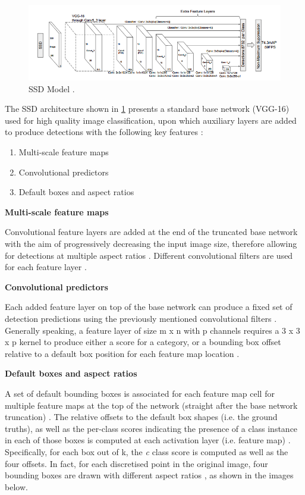 \begin{figure}[!htbp]
\begin{center}
\includegraphics[width=\linewidth]{images/ssd_architecture.png}
\end{center}
\caption{SSD Model \cite{paper:SSD}.}
\label{fig:sshModel}
\end{figure}

The SSD architecture shown in \ref{fig:sshModel} presents a standard base network (VGG-16) used for high quality image classification, upon which auxiliary layers are added to produce detections with the following key features \cite{paper:SSD}:

\begin{enumerate}
  \item Multi-scale feature maps
  \item Convolutional predictors
  \item Default boxes and aspect ratios
\end{enumerate}

\textbf{Multi-scale feature maps}

Convolutional feature layers are added at the end of the truncated base network with the aim of progressively decreasing the input image size, therefore allowing for detections at multiple aspect ratios \cite{paper:SSD}. Different convolutional filters are used for each feature layer \cite{paper:SSD}.

\textbf{Convolutional predictors}

Each added feature layer on top of the base network can produce a fixed set of detection predictions using the previously mentioned convolutional filters \cite{paper:SSD}. Generally speaking, a feature layer of size m x n with p channels requires a 3 x 3 x p kernel to produce either a score for a category, or a bounding box offset relative to a default box position for each feature map location \cite{paper:SSD}.

\textbf{Default boxes and aspect ratios}

A set of default bounding boxes is associated for each feature map cell for multiple feature maps at the top of the network (straight after the base network truncation) \cite{paper:SSD}. The relative offsets to the default box shapes (i.e. the ground truths), as well as the per-class scores indicating the presence of a class instance in each of those boxes is computed at each activation layer (i.e. feature map) \cite{paper:SSD}. Specifically, for each box out of k, the \textit{c} class score is computed as well as the four offsets. In fact, for each discretised point in the original image, four bounding boxes are drawn with different aspect ratios \cite{paper:SSD}, as shown in the images below.

